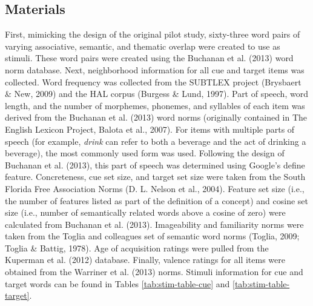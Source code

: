 \documentclass[english,man]{apa6}
\theoremstyle{definition}
\theoremstyle{definition}
\theoremstyle{definition}
\theoremstyle{remark}
\begin{document}
\subsection{Materials}\label{materials}

First, mimicking the design of the original pilot study, sixty-three
word pairs of varying associative, semantic, and thematic overlap were
created to use as stimuli. These word pairs were created using the
Buchanan et al. (2013) word norm database. Next, neighborhood
information for all cue and target items was collected. Word frequency
was collected from the SUBTLEX project (Brysbaert \& New, 2009) and the
HAL corpus (Burgess \& Lund, 1997). Part of speech, word length, and the
number of morphemes, phonemes, and syllables of each item was derived
from the Buchanan et al. (2013) word norms (originally contained in The
English Lexicon Project, Balota et al., 2007). For items with multiple
parts of speech (for example, \emph{drink} can refer to both a beverage
and the act of drinking a beverage), the most commonly used form was
used. Following the design of Buchanan et al. (2013), this part of
speech was determined using Google's define feature. Concreteness, cue
set size, and target set size were taken from the South Florida Free
Association Norms (D. L. Nelson et al., 2004). Feature set size (i.e.,
the number of features listed as part of the definition of a concept)
and cosine set size (i.e., number of semantically related words above a
cosine of zero) were calculated from Buchanan et al. (2013).
Imageability and familiarity norms were taken from the Toglia and
colleagues set of semantic word norms (Toglia, 2009; Toglia \& Battig,
1978). Age of acquisition ratings were pulled from the Kuperman et al.
(2012) database. Finally, valence ratings for all items were obtained
from the Warriner et al. (2013) norms. Stimuli information for cue and
target words can be found in Tables \ref{tab:stim-table-cue} and
\ref{tab:stim-table-target}.
\end{document}
